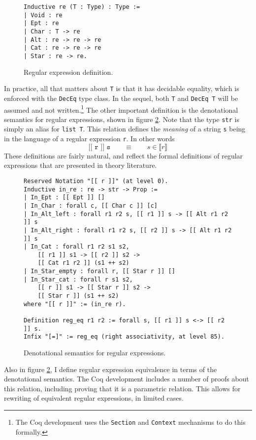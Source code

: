 \documentclass{article}
\newcommand{\coq}[1]{\texttt{#1}}
\begin{document}
\begin{figure}
  \centering
\begin{verbatim}
Inductive re (T : Type) : Type :=
| Void : re
| Ept : re
| Char : T -> re
| Alt : re -> re -> re
| Cat : re -> re -> re
| Star : re -> re.
\end{verbatim}
\caption{Regular expression definition.}
\label{fig:re}
\end{figure}
 In practice, all that matters about \coq{T} is that it has decidable equality,
which is enforced with the \coq{DecEq} type class. In the sequel, both \coq{T}
and \coq{DecEq T} will be assumed and not written.\footnote{The Coq development
uses the \coq{Section} and \coq{Context} mechanisms to do this formally.} The
other important definition is the denotational semantics for regular
expressions, shown in figure \ref{fig:in_re}. Note that the type \coq{str} is
simply an alias for \coq{list T}. This relation defines the \emph{meaning} of a
string \coq{s} being in the language of a regular expression \coq{r}. In other
words
$$ \coq{[[ r ]] s} \qquad \equiv \qquad s \in \llbracket r \rrbracket $$
These definitions are fairly natural, and reflect the formal definitions of
regular expressions that are presented in theory literature.

\begin{figure}
  \centering
\begin{verbatim}
Reserved Notation "[[ r ]]" (at level 0).
Inductive in_re : re -> str -> Prop :=
| In_Ept : [[ Ept ]] []
| In_Char : forall c, [[ Char c ]] [c]
| In_Alt_left : forall r1 r2 s, [[ r1 ]] s -> [[ Alt r1 r2 ]] s
| In_Alt_right : forall r1 r2 s, [[ r2 ]] s -> [[ Alt r1 r2 ]] s
| In_Cat : forall r1 r2 s1 s2,
    [[ r1 ]] s1 -> [[ r2 ]] s2 ->
    [[ Cat r1 r2 ]] (s1 ++ s2)
| In_Star_empty : forall r, [[ Star r ]] []
| In_Star_cat : forall r s1 s2,
    [[ r ]] s1 -> [[ Star r ]] s2 ->
    [[ Star r ]] (s1 ++ s2)
where "[[ r ]]" := (in_re r).

Definition reg_eq r1 r2 := forall s, [[ r1 ]] s <-> [[ r2 ]] s.
Infix "[=]" := reg_eq (right associativity, at level 85).
\end{verbatim}
\caption{Denotational semantics for regular expressions.}
\label{fig:in_re}
\end{figure}

Also in figure \ref{fig:in_re}, I define regular expression equivalence in
terms of the denotational semantics. The Coq development includes a number of
proofs about this relation, including proving that it is a parametric relation.
This allows for rewriting of equivalent regular expressions, in limited cases.
\end{document}
